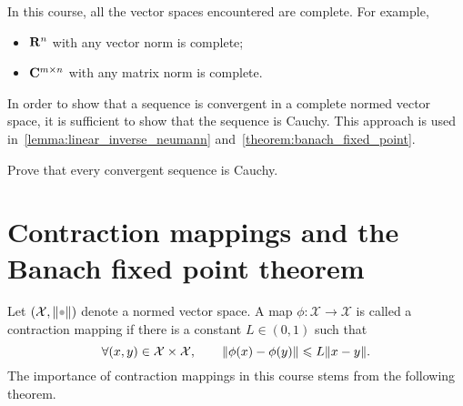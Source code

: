 In this course,
all the vector spaces encountered are complete.
For example,
\begin{itemize}
    \item $\mathbf R^n$ with any vector norm is complete;
    \item $\mathbf C^{m\times n}$ with any matrix norm is complete.
\end{itemize}
In order to show that a sequence is convergent in a complete normed vector space,
it is sufficient to show that the sequence is Cauchy.
This approach is used in~\cref{lemma:linear_inverse_neumann} and~\cref{theorem:banach_fixed_point}.

\begin{exercise}
    Prove that every convergent sequence is Cauchy.
\end{exercise}

\section{Contraction mappings and the Banach fixed point theorem}
Let $(\mathcal X, \norm{\placeholder})$ denote a normed vector space.
A map $\phi\colon \mathcal X \to \mathcal X$ is called a contraction mapping if
there is a constant $L \in (0, 1)$ such that
\[
    \forall (x, y) \in \mathcal X \times \mathcal X, \qquad
    \lVert\phi(x) - \phi(y)\rVert \leqslant L \lVert x - y\rVert.
\]
The importance of contraction mappings in this course stems from the following theorem.

